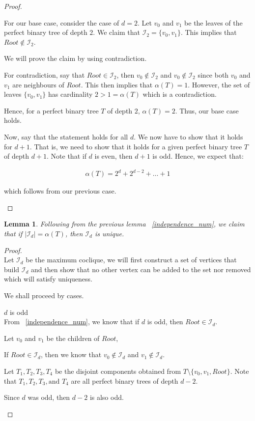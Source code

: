 \documentclass{article}
\newtheorem{lemma}[theorem]{Lemma}
\theoremstyle{definition}
\begin{document}
\begin{proof}
\begin{caseof}
		For our base case, consider the case of $d = 2$. Let $v_0$ and $v_1$ be the leaves of the perfect binary tree of depth $2$. We claim that $\mathcal{I}_2 = \{v_0, v_1\}$. This implies that $Root \not\in \mathcal{I}_2$. 

		We will prove the claim by using contradiction.	

		For contradiction, say that $Root \in \mathcal{I}_2$, then $v_0 \not\in \mathcal{I}_2$ and $v_0 \not\in \mathcal{I}_2$ since both $v_0$ and $v_1$ are neighbours of $Root$. This then implies that $\alpha(T) = 1$. However, the set of leaves $\{v_0, v_1\}$ has cardinality $2 > 1 = \alpha(T)$ which is a contradiction.

		Hence, for a perfect binary tree $T$ of depth $2$, $\alpha(T) = 2$. Thus, our base case holds.


		Now, say that the statement holds for all $d$. We now have to show that it holds for $d+1$. That is, we need to show that it holds for a given perfect binary tree $T$ of depth $d + 1$. Note that if $d$ is even, then $d + 1$ is odd. Hence, we expect that:

		\begin{align*}
			\alpha(T) = 2^d + 2^{d - 2} + \ldots + 1
		\end{align*}

		which follows from our previous case.
	\end{caseof}
\end{proof}

\begin{lemma}
Following from the previous lemma ~\ref{independence_num}, we claim that if $|\mathcal{I}_d| = \alpha(T)$, then $\mathcal{I}_d$ is unique.
\end{lemma}
\begin{proof}
	$ $ \\
	Let $\mathcal{I}_d$ be the maximum coclique, we will first construct a set of vertices that build $\mathcal{I}_d$ and then show that no other vertex can be added to the set nor removed which will satisfy uniqueness.

	We shall proceed by cases.
	\begin{caseof}
	\item $d$ is odd \\
		From ~\ref{independence_num}, we know that if $d$ is odd, then $Root \in \mathcal{I}_d$. 

		Let $v_0$ and $v_1$ be the children of $Root$, 

		If $Root \in \mathcal{I}_d$, then we know that $v_0 \not\in \mathcal{I}_d$ and $v_1 \not\in \mathcal{I}_d$.

		Let $T_1, T_2, T_3, T_4$ be the disjoint components obtained from $T\setminus\{v_0, v_1, Root\}$. Note that $T_1, T_2, T_3, \text{and } T_4$ are all perfect binary trees of depth $d - 2$.

		Since $d$ was odd, then $d - 2$ is also odd.
	\end{caseof}
\end{proof}
\end{document}
